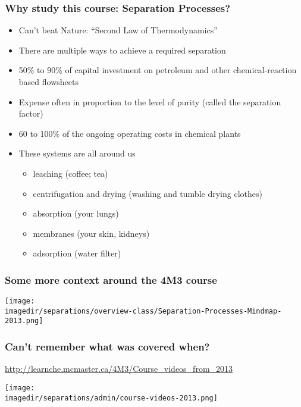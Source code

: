 \begin{frame}\frametitle{Why study this course: Separation Processes?}
	\begin{itemize}
		\item	Can't beat Nature: ``Second Law of Thermodynamics''
		\item	There are multiple ways to achieve a required separation
		\item	50\% to 90\% of capital investment on petroleum and other chemical-reaction based flowsheets 
		\item	Expense often in proportion to the level of purity (called the separation factor) %
		\item	60 to 100\% of the ongoing operating costs in chemical plants  %
		\item	These systems are all around us
		\begin{itemize}
			\item	leaching (coffee; tea)
			\item	centrifugation and drying (washing and tumble drying clothes)
			\item	absorption (your lungs)
			\item	membranes (your skin, kidneys)
			\item	adsorption (water filter)
		\end{itemize}
	\end{itemize}
\end{frame}

\begin{frame}\frametitle{Some more context around the 4M3 course}
	\begin{center}
		\texttt{[image: \\imagedir/separations/overview-class/Separation-Processes-Mindmap-2013.png]}
	\end{center}
\end{frame}

\begin{frame}\frametitle{Can't remember what was covered when?}
	\begin{exampleblock}{}
		\href{http://learnche.mcmaster.ca/4M3/Course\_videos\_from\_2013}{http://learnche.mcmaster.ca/4M3/Course\_videos\_from\_2013}
	\end{exampleblock}
	\begin{center}
		\texttt{[image: \\imagedir/separations/admin/course-videos-2013.png]}
	\end{center}
\end{frame}

